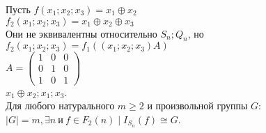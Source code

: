 \example 
Пусть $f(x_1;x_2;x_3) = x_1\oplus x_2$\\
$f_2(x_1;x_2;x_3)=x_1 \oplus x_2 \oplus x_3$ \\
Они не эквивалентны относительно $S_n;Q_n$, но
$f_2(x_1;x_2;x_3)=f_1((x_1;x_2;x_3)A)$\\



$A=
\begin{pmatrix}
  1 & 0 & 0\\
  0 & 1 & 0\\
  1 & 0 & 1
\end{pmatrix}$\\

$x_1 \oplus x_2;x_1;x_3$.\\

\thr
Для любого натурального $ m \geqslant 2$ и произвольной группы $G$:
$|G|=m, \exists n\  \text{и}\  f\in F_2(n) \mid I_{S_n}(f) \cong G$.